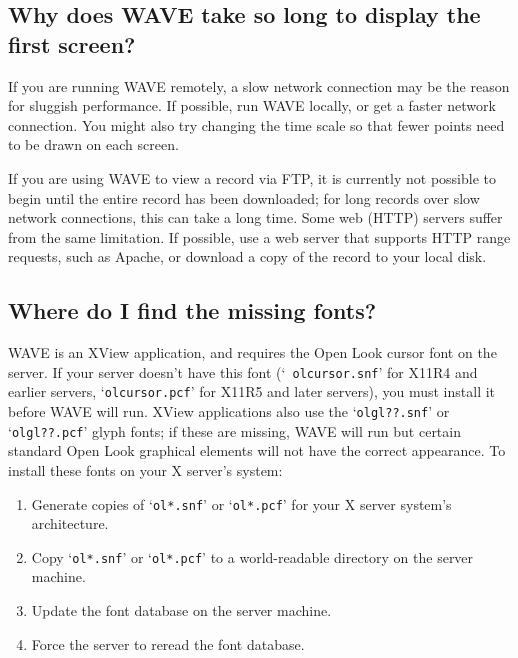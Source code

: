 \documentclass[twoside]{book}
\newcommand{\WAVE}{{\sf WAVE}\xspace}
\begin{document}
\subsection{Why does \WAVE{} take so long to display the first screen?}

If you are running \WAVE{} remotely, a slow network connection may be the
reason for sluggish performance.  If possible, run \WAVE{} locally, or get
a faster network connection.  You might also try changing the time scale
so that fewer points need to be drawn on each screen.

If you are using \WAVE{} to view a record via FTP, it is currently not possible
to begin until the entire record has been downloaded;  for long records over
slow network connections, this can take a long time.  Some web (HTTP) servers
suffer from the same limitation.  If possible, use a web server that supports
HTTP range requests, such as Apache, or download a copy of the record to your
local disk.

\subsection{Where do I find the missing fonts?}

\label{faq:missing-fonts}
\WAVE{} is an XView
application, and requires the Open Look cursor font
on the server.  If your server doesn't have this font (`{\tt
olcursor.snf}' for X11R4 and earlier servers, `{\tt olcursor.pcf}' for
X11R5 and later servers), you must install it before \WAVE{} will run.
XView applications also use the `{\tt olgl??.snf}' or `{\tt olgl??.pcf}'
glyph fonts; if these are missing, \WAVE{} will run but certain standard
Open Look graphical elements will not have the correct appearance.  To
install these fonts on your X server's system:

\begin{enumerate}

\item
Generate copies of `{\tt ol*.snf}' or `{\tt ol*.pcf}' for your X server
system's architecture.

\item
Copy `{\tt ol*.snf}' or `{\tt ol*.pcf}' to a world-readable directory on the
server machine.

\item
Update the font database on the server machine.

\item
Force the server to reread the font database.
\end{enumerate}
\end{document}
